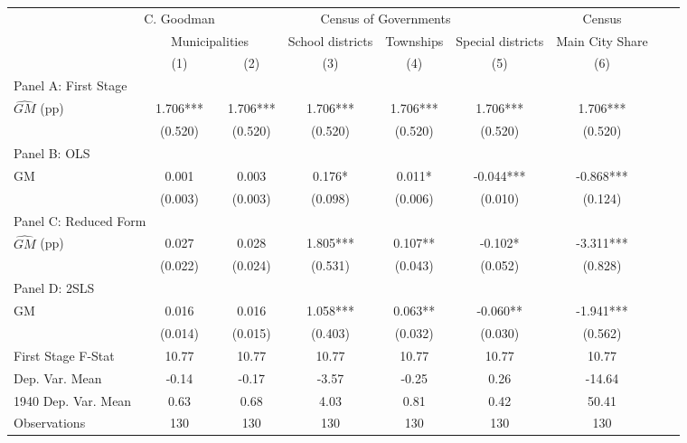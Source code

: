  \begin{tabular}{l*{8}{c}} \toprule
&\multicolumn{1}{c}{C. Goodman}&\multicolumn{4}{c}{Census of Governments}&\multicolumn{1}{c}{Census}\\\cmidrule(lr){2-2}\cmidrule(lr){3-6}\cmidrule(lr){7-7}
&\multicolumn{2}{c}{Municipalities}&\multicolumn{1}{c}{School districts}&\multicolumn{1}{c}{Townships}&\multicolumn{1}{c}{Special districts}&\multicolumn{1}{c}{Main City Share}\\\cmidrule(lr){2-3}\cmidrule(lr){4-6}\cmidrule(lr){7-7}
&\multicolumn{1}{c}{(1)}&\multicolumn{1}{c}{(2)}&\multicolumn{1}{c}{(3)}&\multicolumn{1}{c}{(4)}&\multicolumn{1}{c}{(5)}&\multicolumn{1}{c}{(6)}\\
\cmidrule(lr){1-7}
\multicolumn{6}{l}{Panel A: First Stage}\\
\cmidrule(lr){1-7}
$\widehat{GM}$ (pp)&    1.706***&    1.706***&    1.706***&    1.706***&    1.706***&    1.706***\\
                &  (0.520)   &  (0.520)   &  (0.520)   &  (0.520)   &  (0.520)   &  (0.520)   \\
\cmidrule(lr){1-7}
\multicolumn{6}{l}{Panel B: OLS}\\
\cmidrule(lr){1-7}
GM              &    0.001   &    0.003   &    0.176*  &    0.011*  &   -0.044***&   -0.868***\\
                &  (0.003)   &  (0.003)   &  (0.098)   &  (0.006)   &  (0.010)   &  (0.124)   \\
\cmidrule(lr){1-7}
\multicolumn{6}{l}{Panel C: Reduced Form}\\
\cmidrule(lr){1-7}
$\widehat{GM}$ (pp)&    0.027   &    0.028   &    1.805***&    0.107** &   -0.102*  &   -3.311***\\
                &  (0.022)   &  (0.024)   &  (0.531)   &  (0.043)   &  (0.052)   &  (0.828)   \\
\cmidrule(lr){1-7}
\multicolumn{6}{l}{Panel D: 2SLS}\\
\cmidrule(lr){1-7}
GM              &    0.016   &    0.016   &    1.058***&    0.063** &   -0.060** &   -1.941***\\
                &  (0.014)   &  (0.015)   &  (0.403)   &  (0.032)   &  (0.030)   &  (0.562)   \\
\midrule
First Stage F-Stat&    10.77   &    10.77   &    10.77   &    10.77   &    10.77   &    10.77   \\
Dep. Var. Mean  &    -0.14   &    -0.17   &    -3.57   &    -0.25   &     0.26   &   -14.64   \\
1940 Dep. Var. Mean&     0.63   &     0.68   &     4.03   &     0.81   &     0.42   &    50.41   \\
Observations    &      130   &      130   &      130   &      130   &      130   &      130   \\
 \bottomrule \end{tabular}
